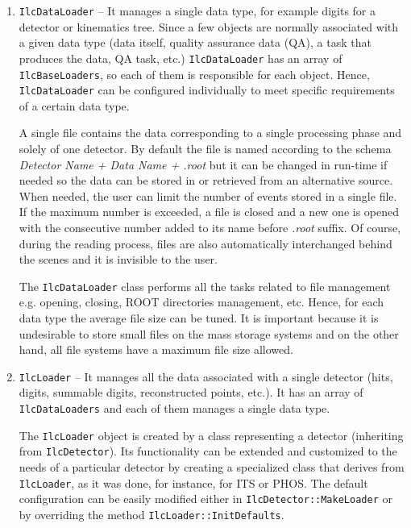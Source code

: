 \documentclass[12pt,a4paper,twoside]{article}
\begin{document}
{\begin{enumerate}
\item \texttt{IlcDataLoader} -- It manages a single data type, for example digits for
  a detector or kinematics tree. 
  Since a few objects are normally associated with a given 
  data type (data itself, quality assurance data (QA), 
  a task that produces the data, QA task, etc.) 
  \texttt{IlcDataLoader} has an array of \texttt{IlcBaseLoaders}, 
  so each of them is responsible for each object.
  Hence, \texttt{IlcDataLoader} can be configured individually to 
  meet specific requirements of a certain data type.

  A single file contains the data corresponding to a single processing 
  phase and solely of one detector.
  By default the file is named according to the schema
  {\it Detector Name + Data Name + .root} but it can be 
  changed in run-time if needed so the data can be stored in or retrieved
  from an alternative source. When needed, 
  the user can limit the number of events stored in a single file.
  If the maximum number is exceeded, a file is closed
  and a new one is opened with the consecutive number added
  to  its name before {\it .root} suffix. Of course, 
  during the reading process, files are also automatically 
  interchanged behind the scenes and it is invisible to the user.

  The \texttt{IlcDataLoader} class performs all the tasks related 
  to  file management e.g. opening, closing, 
  ROOT directories management, etc. 
  Hence, for each data type the average file size can be 
  tuned. It is important because it is undesirable to store small 
  files on the mass storage systems and on the other hand, all file 
  systems have a maximum file size allowed.
  

\item \texttt{IlcLoader}  --    It manages all the data associated with a 
  single detector (hits, digits, summable digits, reconstructed points, etc.). 
  It has an array of \texttt{IlcDataLoaders} and each of them manages 
  a single data type. 
  
  The \texttt{IlcLoader} object is created by a class representing 
  a detector (inheriting from \texttt{IlcDetector}). 
  Its functionality can be extended and customized to the needs of a 
  particular detector by creating a specialized class that derives
  from \texttt{IlcLoader}, as it was done, for instance, for ITS or PHOS. 
  The default configuration can be 
  easily modified either in \texttt{IlcDetector::MakeLoader} 
  or by overriding the method \texttt{IlcLoader::InitDefaults}.
  

\end{enumerate}}
\end{document}
